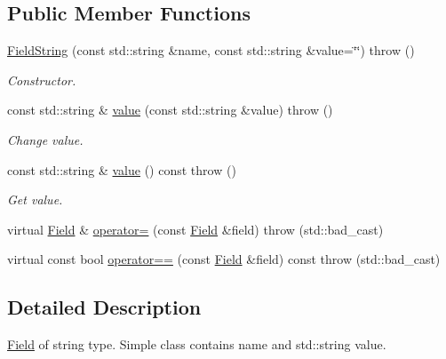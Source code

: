 \subsection*{Public Member Functions}
\begin{DoxyCompactItemize}
\item 
\hyperlink{classCore_1_1FieldString_aeea00d447ccc028124716bef705b9359}{FieldString} (const std::string \&name, const std::string \&value=\char`\"{}\char`\"{})  throw ()
\begin{DoxyCompactList}\small\item\em Constructor. \item\end{DoxyCompactList}\item 
const std::string \& \hyperlink{classCore_1_1FieldString_a1cf5a18e64379806684e0bb110a002d1}{value} (const std::string \&value)  throw ()
\begin{DoxyCompactList}\small\item\em Change value. \item\end{DoxyCompactList}\item 
const std::string \& \hyperlink{classCore_1_1FieldString_a31f2a21becad6221f033daaf8aa161d7}{value} () const   throw ()
\begin{DoxyCompactList}\small\item\em Get value. \item\end{DoxyCompactList}\item 
virtual \hyperlink{classCore_1_1Field}{Field} \& \hyperlink{classCore_1_1FieldString_a78a8bc98252c1be096848c5cdebb2868}{operator=} (const \hyperlink{classCore_1_1Field}{Field} \&field)  throw (std::bad\_\-cast)
\item 
virtual const bool \hyperlink{classCore_1_1FieldString_adacfe0012314f6840b2657d63ffe8c49}{operator==} (const \hyperlink{classCore_1_1Field}{Field} \&field) const   throw (std::bad\_\-cast)
\end{DoxyCompactItemize}


\subsection{Detailed Description}
\hyperlink{classCore_1_1Field}{Field} of string type. Simple class contains name and std::string value. 

